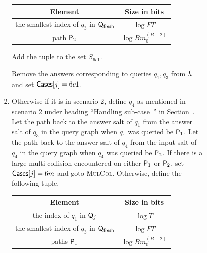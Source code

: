 \begin{enumerate}
\begin{enumerate}
\begin{itemize}
\begin{itemize}
\begin{enumerate}
\begin{center}
\begin{tabular}{|c|c|}
      Element & Size in bits \\ \hline\hline
  
  
      the smallest index  of $q_3$ in $\qf$ & $\log FT$   \\\hline
              
      path $\pth_2$ & $ \log Bm_0^{(B-2)}$\\\hline
      
      \end{tabular}
      \end{center}
    Add the tuple to the set $S_{6c1}$.
    
    Remove the answers corresponding to queries $q_1,q_3$ from $\hrest$ and set $\cs[j]=6c1$.
    \item Otherwise if it is in scenario 2, define $q_4$ as mentioned in scenario 2 under heading ``Handling sub-case~'' in Section~. Let the path back to the answer salt of $q_1$ from the answer salt of $q_3$ in the query graph when $q_1$ was queried be $\mathsf{P}_1$. Let the path back to the answer salt of $q_4$ from the input salt of $q_4$ in the query graph when $q_4$ was queried be $\pth_2$.
    If there is a large multi-collision encountered on either $\mathsf{P}_1$ or $\pth_2$, set $\mathsf{Cases}[j]=6m$ and goto \textsc{MulCol}. Otherwise, define the following tuple.
        \begin{center}
          \begin{tabular}{|c|c|}\hline
      
          Element & Size in bits \\ \hline\hline
      
          the index of $q_1$ in $\mathsf{Q}_j$ & $\log T$\\ \hline
      
          the smallest index  of $q_3$ in $\qf$ & $\log FT$   \\\hline
                  
          paths $\mathsf{P}_1$ & $ \log Bm_0^{(B-2)}$\\\hline
          

\end{tabular}
\end{center}
\end{enumerate}
\end{itemize}
\end{itemize}
\end{enumerate}
\end{enumerate}
